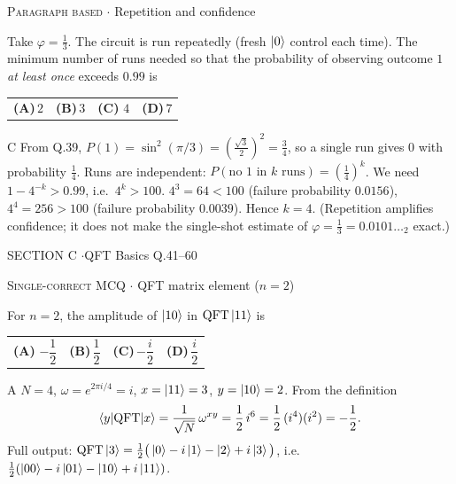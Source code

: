 \documentclass[11pt,a4paper]{article}
\newcommand{\optlabel}[1]{\textbf{(#1)}}
\newcommand{\correctlabel}[1]{\textcolor{okgreen}{\textbf{(#1)}\,\ding{51}}}
\newenvironment{qitem}[1]{\begin{list}{}{\setlength{\leftmargin}{3.3em}\setlength{\labelwidth}{3.1em}%
  \setlength{\labelsep}{0.2em}\setlength{\topsep}{3pt}\setlength{\parsep}{3pt}}\item[\textbf{Q.#1}\hfill]}{\end{list}}
\newcommand{\qsep}{\par\vspace{2pt}{\color{black!15}\hrule}\vspace{4pt}}
\newcommand{\qmeta}[2]{{\footnotesize\color{black!60}\textsc{#1} \;$\cdot$\; #2}\par}
\begin{document}
\begin{qitem}{40}
\qmeta{Paragraph based}{Repetition and confidence}
Take $\varphi = \frac13$. The circuit is run repeatedly (fresh $\ket0$ control each time). The minimum number of runs
needed so that the probability of observing outcome $1$ \emph{at least once} exceeds $0.99$ is
\par\smallskip\noindent\begin{tabularx}{\linewidth}{@{}*{4}{L}@{}}
\optlabel{A}\,$2$ & \optlabel{B}\,$3$ & \correctlabel{C}\,$4$ & \optlabel{D}\,$7$
\end{tabularx}
\end{qitem}
\begin{solbox}{C}
From Q.39, $P(1) = \sin^2(\pi/3) = \left(\frac{\sqrt3}{2}\right)^2 = \frac34$, so a single run gives 0 with probability $\frac14$.
Runs are independent: $P(\text{no } 1 \text{ in } k \text{ runs}) = \left(\frac14\right)^k$. We need $1 - 4^{-k} > 0.99$, i.e.\ $4^k > 100$.
$4^3 = 64 < 100$ (failure probability $0.0156$), $4^4 = 256 > 100$ (failure probability $0.0039$). Hence $k = 4$.
(Repetition amplifies confidence; it does not make the single-shot estimate of $\varphi = \frac13 = 0.0101\ldots_2$ exact.)
\end{solbox}
\qsep

\newpage

\begin{sectionbanner}SECTION C \enspace$\cdot$\enspace QFT Basics \hfill Q.41--60\end{sectionbanner}

\begin{qitem}{41}
\qmeta{Single-correct MCQ}{QFT matrix element ($n = 2$)}
For $n = 2$, the amplitude of $\ket{10}$ in $\mathrm{QFT}\ket{11}$ is
\par\smallskip\noindent\begin{tabularx}{\linewidth}{@{}*{4}{L}@{}}
\correctlabel{A}\,$-\dfrac12$ & \optlabel{B}\,$\dfrac12$ & \optlabel{C}\,$-\dfrac{i}{2}$ & \optlabel{D}\,$\dfrac{i}{2}$
\end{tabularx}
\end{qitem}
\begin{solbox}{A}
$N = 4$, $\omega = e^{2\pi i/4} = i$, $x = \ket{11} = 3$, $y = \ket{10} = 2$. From the definition
\[ \braket{y|\mathrm{QFT}|x} = \frac{1}{\sqrt N}\,\omega^{xy} = \frac12\, i^{6} = \frac12\,(i^4)(i^2) = -\frac12 . \]
Full output: $\mathrm{QFT}\ket{3} = \frac12\big(\ket0 - i\ket1 - \ket2 + i\ket3\big)$, i.e.\ $\frac12(\ket{00} - i\ket{01} - \ket{10} + i\ket{11})$.
\end{solbox}
\qsep
\end{document}
